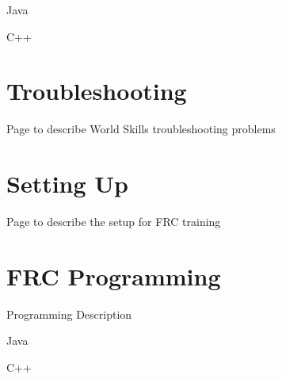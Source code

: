\documentclass[letterpaper,10pt,english]{sphinxmanual}
\begin{document}
Java

C++

\begin{sphinxVerbatim}[commandchars=\\\{\}]
     
\end{sphinxVerbatim}

\begin{sphinxVerbatim}[commandchars=\\\{\}]
   
\end{sphinxVerbatim}


\chapter{Troubleshooting}
\label{\detokenize{docs/WorldSkills/troubleshooting:troubleshooting}}\label{\detokenize{docs/WorldSkills/troubleshooting::doc}}
Page to describe World Skills troubleshooting problems


\chapter{Setting Up}
\label{\detokenize{docs/FRCTraining/setup:setting-up}}\label{\detokenize{docs/FRCTraining/setup::doc}}
Page to describe the set\sphinxhyphen{}up for FRC training


\chapter{FRC Programming}
\label{\detokenize{docs/FRCTraining/programming:frc-programming}}\label{\detokenize{docs/FRCTraining/programming::doc}}
Programming Description

Java

C++

\begin{sphinxVerbatim}[commandchars=\\\{\}]
     
\end{sphinxVerbatim}

\begin{sphinxVerbatim}[commandchars=\\\{\}]
   
\end{sphinxVerbatim}
\end{document}
